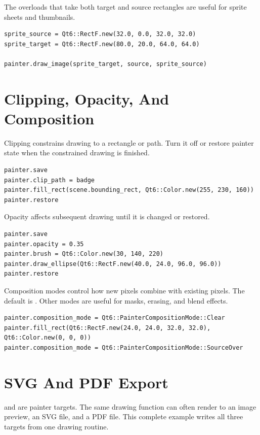 The overloads that take both target and source rectangles are useful for sprite sheets and thumbnails.

\begin{lstlisting}[style=crystal]
sprite_source = Qt6::RectF.new(32.0, 0.0, 32.0, 32.0)
sprite_target = Qt6::RectF.new(80.0, 20.0, 64.0, 64.0)

painter.draw_image(sprite_target, source, sprite_source)
\end{lstlisting}

\section{Clipping, Opacity, And Composition}

Clipping constrains drawing to a rectangle or path. Turn it off or restore painter state when the constrained drawing is finished.

\begin{lstlisting}[style=crystal]
painter.save
painter.clip_path = badge
painter.fill_rect(scene.bounding_rect, Qt6::Color.new(255, 230, 160))
painter.restore
\end{lstlisting}

Opacity affects subsequent drawing until it is changed or restored.

\begin{lstlisting}[style=crystal]
painter.save
painter.opacity = 0.35
painter.brush = Qt6::Color.new(30, 140, 220)
painter.draw_ellipse(Qt6::RectF.new(40.0, 24.0, 96.0, 96.0))
painter.restore
\end{lstlisting}

Composition modes control how new pixels combine with existing pixels. The default is . Other modes are useful for masks, erasing, and blend effects.

\begin{lstlisting}[style=crystal]
painter.composition_mode = Qt6::PainterCompositionMode::Clear
painter.fill_rect(Qt6::RectF.new(24.0, 24.0, 32.0, 32.0), Qt6::Color.new(0, 0, 0))
painter.composition_mode = Qt6::PainterCompositionMode::SourceOver
\end{lstlisting}

\section{SVG And PDF Export}

 and  are painter targets. The same drawing function can often render to an image preview, an SVG file, and a PDF file. This complete example writes all three targets from one drawing routine.

